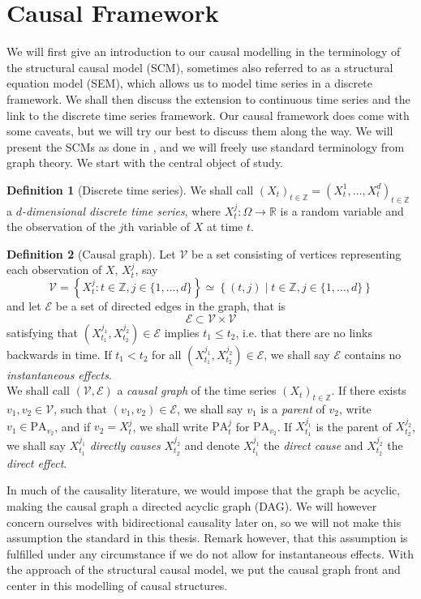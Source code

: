 \documentclass[11pt, a4paper]{memoir}
\theoremstyle{plain}
\theoremstyle{definition}
\newtheorem{defn}{Definition}
\newcommand{\mZ}{\mathbb{Z}}
\newcommand{\mR}{\mathbb{R}}
\begin{document}
\section{Causal Framework}
We will first give an introduction to our causal modelling in the terminology of the structural causal model (SCM), sometimes also referred to as a structural equation model (SEM),  which allows us to model time series in a discrete framework. We shall then discuss the extension to continuous time series and the link to the discrete time series framework. Our causal framework does come with some caveats, but we will try our best to discuss them along the way. We will present the SCMs as done in \cite{Peters}, and we will freely use standard terminology from graph theory. We start with the central object of study.
\begin{defn}[Discrete time series]
We shall call $(X_t)_{t\in \mZ}=(X_t^{1},\ldots,X_{t}^d)_{t\in \mZ}$ a \emph{$d$-dimensional discrete time series}, where $X_t^j:\Omega\to \mR$ is a random variable and the observation of the $j$th variable of $X$ at time $t$.
\end{defn}
\begin{defn}[Causal graph]
Let $\mathcal{V}$ be a set consisting of vertices representing each observation of $X$, $X_t^j$, say $$\mathcal{V}=\left\{X_t^j: t\in \mZ,j\in\{1,\ldots,d\}\right\}\simeq \left\{(t,j)\mid t\in \mZ, j\in \{1,\ldots,d\}\right\}$$ and let $\mathcal{E}$ be a set of directed edges in the graph, that is 
$$\mathcal{E}\subset \mathcal{V}\times \mathcal{V}$$
satisfying that $(X_{t_1}^{j_1},X_{t_2}^{j_2})\in \mathcal{E}$ implies $t_1\leq t_2$, i.e. that there are no links backwards in time. If $t_1<t_2$ for all $(X_{t_1}^{j_1},X_{t_2}^{j_2})\in \mathcal{E}$, we shall say $\mathcal{E}$ contains no \emph{instantaneous effects}.\\
We shall call $(\mathcal{V}, \mathcal{E})$ a \emph{causal graph} of the time series $(X_t)_{t\in \mZ}$. If there exists $v_1,v_2\in \mathcal{V}$, such that $(v_1,v_2)\in \mathcal{E}$, we shall say $v_1$ is a \emph{parent} of $v_2$, write $v_1\in \text{PA}_{v_2}$, and if $v_2=X_t^j$, we shall write $\text{PA}_{t}^j$ for $\text{PA}_{v_2}$. If $X_{t_1}^{j_1}$ is the parent of $X_{t_2}^{j_2}$, we shall say $X_{t_1}^{j_1}$ \emph{directly causes} $X_{t_2}^{j_2}$ and denote $X_{t_1}^{j_1}$ the \emph{direct cause} and $X_{t_2}^{j_2}$ the \emph{direct effect}.
\end{defn}
In much of the causality literature, we would impose that the graph be acyclic, making the causal graph a directed acyclic graph (DAG). We will however concern ourselves with bidirectional causality later on, so we will not make this assumption the standard in this thesis. Remark however, that this assumption is fulfilled under any circumstance if we do not allow for instantaneous effects. With the approach of the structural causal model, we put the causal graph front and center in this modelling of causal structures.
\end{document}

